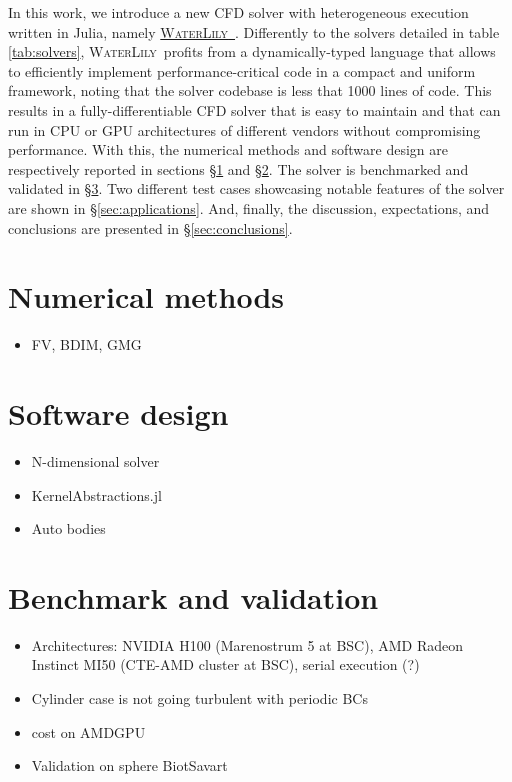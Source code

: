 \documentclass[final,3p,times]{elsarticle}
\newcommand\WaterLily[0]{\textsc{WaterLily}~}
\begin{document}
In this work, we introduce a new CFD solver with heterogeneous execution written in Julia, namely \href{https://github.com/weymouth/WaterLily.jl}{\WaterLily}. Differently to the solvers detailed in table \ref{tab:solvers}, \WaterLily profits from a dynamically-typed language that allows to efficiently implement performance-critical code in a compact and uniform framework, noting that the solver codebase is less that 1000 lines of code. This results in a fully-differentiable CFD solver that is easy to maintain and that can run in CPU or GPU architectures of different vendors without compromising performance. With this, the numerical methods and software design are respectively reported in sections \S\ref{sec:numerical_methods} and \S\ref{sec:software_design}. The solver is benchmarked and validated in \S\ref{sec:benchmark_validation}. Two different test cases showcasing notable features of the solver are shown in \S\ref{sec:applications}. And, finally, the discussion, expectations, and conclusions are presented in \S\ref{sec:conclusions}.

\section{Numerical methods}\label{sec:numerical_methods}
\begin{itemize}
  \item FV, BDIM, GMG
\end{itemize}

\section{Software design}\label{sec:software_design}
\begin{itemize}
  \item N-dimensional solver
  \item KernelAbstractions.jl
  \item Auto bodies
\end{itemize}

\section{Benchmark and validation} \label{sec:benchmark_validation}
\begin{itemize}
  \item Architectures: NVIDIA H100 (Marenostrum 5 at BSC), AMD Radeon Instinct MI50 (CTE-AMD cluster at BSC), serial execution (?)
  \item Cylinder case is not going turbulent with periodic BCs
  \item cost on AMDGPU
  \item Validation on sphere BiotSavart
\end{itemize}
\end{document}
